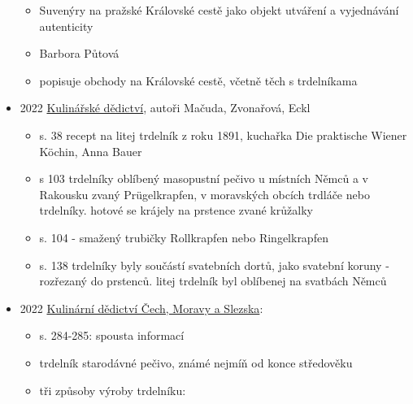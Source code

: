 \begin{itemize}
  \begin{itemize}
  \tightlist
  \item
    Suvenýry na pražské Královské cestě jako objekt utváření a
    vyjednávání autenticity
  \item
    Barbora Půtová
  \item
    popisuje obchody na Královské cestě, včetně těch s trdelníkama
  \end{itemize}
\item
  2022
  \href{https://wirtschaftsmuseum.at/media/downloads/Interreg/Kucharka_Kochbuch_WEB.pdf}{Kulinářské
  dědictví}, autoři Mačuda, Zvonařová, Eckl

  \begin{itemize}
  \tightlist
  \item
    s. 38 recept na litej trdelník z roku 1891, kuchařka Die praktische
    Wiener Köchin, Anna Bauer
  \item
    s 103 trdelníky oblíbený masopustní pečivo u místních Němců a v
    Rakousku zvaný Prügelkrapfen, v moravských obcích trdláče nebo
    trdelníky. hotové se krájely na prstence zvané krůžalky
  \item
    s. 104 - smažený trubičky Rollkrapfen nebo Ringelkrapfen
  \item
    s. 138 trdelníky byly součástí svatebních dortů, jako svatební
    koruny - rozřezaný do prstenců. litej trdelník byl oblíbenej na
    svatbách Němců
  \end{itemize}
\item
  2022
  \href{https://kulturni-dejiny.slu.cz/data/uploads/067/upvysledky/067-2022-4-kulinarni_dedictvi_web_enc.pdf}{Kulinární
  dědictví Čech, Moravy a Slezska}:

  \begin{itemize}
  \tightlist
  \item
    s. 284-285: spousta informací
  \item
    trdelník starodávné pečivo, známé nejmíň od konce středověku
  \item
    tři způsoby výroby trdelníku:


\end{itemize}
\end{itemize}
